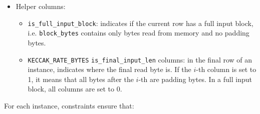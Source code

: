 \begin{itemize}
    \item Helper columns:
    \begin{itemize}
        \item \texttt{is\_full\_input\_block}: indicates if the current row has a full input block, i.e. \texttt{block\_bytes} contains only bytes read from memory and no padding bytes.
        \item \texttt{KECCAK\_RATE\_BYTES} \texttt{is\_final\_input\_len} columns: in the final row of an instance, indicates where the final read byte is. If the $i$-th column is set to 1, it means that
all bytes after the $i$-th are padding bytes. In a full input block, all columns are set to 0. 
    \end{itemize}
\end{itemize}

For each instance, constraints ensure that:
